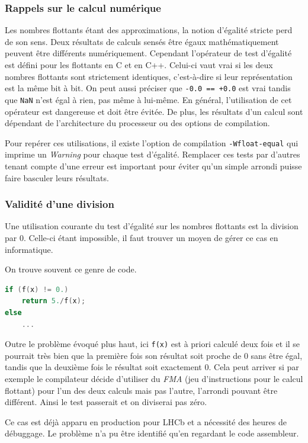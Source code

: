 \documentclass[a4paper,11pt]{report}
\begin{document}
\subsubsection{Rappels sur le calcul numérique}
Les nombres flottants étant des approximations, la notion d'égalité stricte perd de son sens.
Deux résultats de calculs sensés être égaux mathématiquement peuvent être différents numériquement.
Cependant l'opérateur de test d'égalité est défini pour les flottants en C et en C++.
Celui-ci vaut vrai si les deux nombres flottants sont strictement identiques, c'est-à-dire si leur représentation est la même bit à bit.
On peut aussi préciser que \verb'-0.0 == +0.0' est vrai tandis que \verb'NaN' n'est égal à rien, pas même à lui-même.
En général, l'utilisation de cet opérateur est dangereuse et doit être évitée.
De plus, les résultats d'un calcul sont dépendant de l'architecture du processeur ou des options de compilation.

Pour repérer ces utilisations, il existe l'option de compilation \verb'-Wfloat-equal' qui imprime un \emph{Warning} pour chaque test d'égalité.
Remplacer ces tests par d'autres tenant compte d'une erreur est important pour éviter qu'un simple arrondi puisse faire basculer leurs résultats.

\subsubsection{Validité d'une division}
Une utilisation courante du test d'égalité sur les nombres flottants est la division par 0.
Celle-ci étant impossible, il faut trouver un moyen de gérer ce cas en informatique.

On trouve souvent ce genre de code.
\begin{lstlisting}[language=c++]
if (f(x) != 0.)
    return 5./f(x);
else
    ...
\end{lstlisting}
Outre le problème évoqué plus haut, ici \verb'f(x)' est à priori calculé deux fois et il se pourrait très bien que la première fois son résultat soit proche de 0 sans être égal, tandis que la deuxième fois le résultat soit exactement 0.
Cela peut arriver si par exemple le compilateur décide d'utiliser du \emph{FMA} (jeu d'instructions pour le calcul flottant) pour l'un des deux calculs mais pas l'autre, l'arrondi pouvant être différent.
Ainsi le test passerait et on diviserai pas zéro.

Ce cas est déjà apparu en production pour LHCb et a nécessité des heures de débuggage.
Le problème n'a pu être identifié qu'en regardant le code assembleur.
\end{document}
